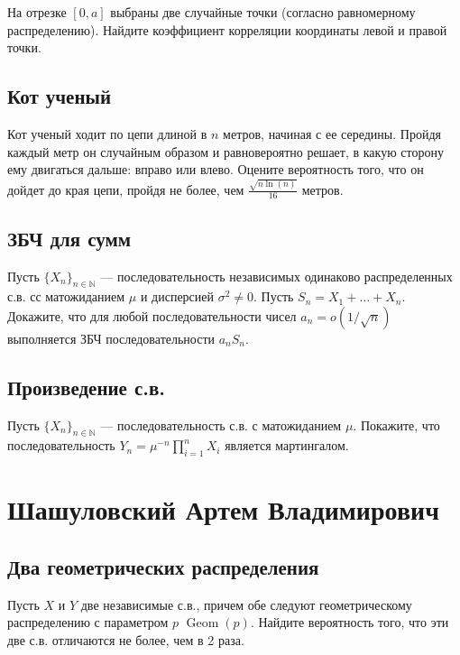 \documentclass[12pt]{article}
\newcommand\N{\mathbb{N}}
\DeclareMathOperator{\Geom}{Geom}
\begin{document}
На отрезке $[0, a]$ выбраны две случайные точки (согласно равномерному распределению). Найдите коэффициент корреляции координаты левой и правой точки. 



\subsection{Кот ученый}

Кот ученый ходит по цепи длиной в $n$ метров, начиная с ее середины. Пройдя каждый метр он случайным образом и равновероятно решает, в какую сторону ему двигаться дальше: вправо или влево. Оцените вероятность того, что он дойдет до края цепи, пройдя не более, чем $\frac{\sqrt{n \ln(n)}}{16}$ метров.



\subsection{ЗБЧ для сумм}
Пусть $\{X_n\}_{n \in \N}$ --- последовательность независимых одинаково распределенных с.в. сс матожиданием $\mu$ и дисперсией $\sigma^2 \ne 0$. Пусть $S_n = X_1 + \dots + X_n$. Докажите, что для любой последовательности чисел $a_n = o(1/\sqrt{n})$ выполняется ЗБЧ последовательности $a_n S_n$.



\subsection{Произведение с.в.}

Пусть $\{X_n\}_{n \in \N}$ --- последовательность с.в. с матожиданием $\mu$. Покажите, что последовательность $Y_n = \mu^{-n} \prod_{i = 1}^n X_i$ является мартингалом.



\newpage
\section{Шашуловский Артем Владимирович}

\subsection{Два геометрических распределения}

Пусть $X$ и $Y$ две независимые с.в., причем обе следуют геометрическому распределению с параметром $p$ $\Geom(p)$. Найдите вероятность того, что эти две с.в. отличаются не более, чем в 2 раза.
\end{document}
